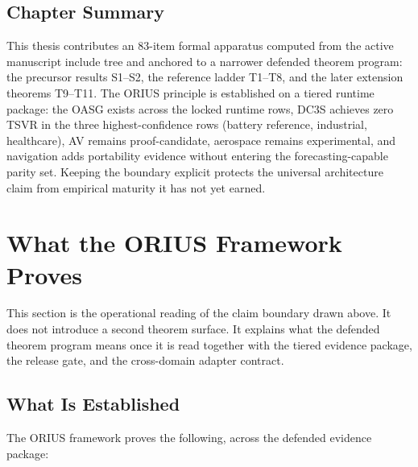 \subsection{Chapter Summary}

This thesis contributes an 83-item formal apparatus computed from the active
manuscript include tree and anchored to a narrower defended theorem program:
the precursor results S1--S2, the reference ladder T1--T8, and the later
extension theorems T9--T11.  The ORIUS principle is established on a tiered
runtime package: the OASG exists across the locked runtime rows, DC3S
achieves zero TSVR in the three highest-confidence rows (battery reference,
industrial, healthcare), AV remains proof-candidate, aerospace remains
experimental, and navigation adds portability evidence without entering the
forecasting-capable parity set.  Keeping the boundary explicit protects the
universal architecture claim from empirical maturity it has not yet earned.


\section{What the ORIUS Framework Proves}
\label{ch:what-battery-thesis-proves}

This section is the operational reading of the claim boundary drawn above.
It does not introduce a second theorem surface.  It explains what the
defended theorem program means once it is read together with the tiered
evidence package, the release gate, and the cross-domain adapter contract.

\subsection{What Is Established}

The ORIUS framework proves the following, across the defended evidence package:

